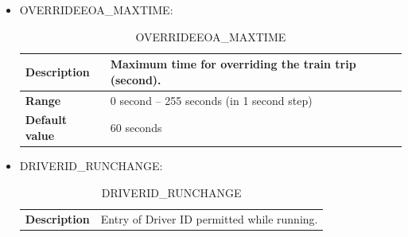 \documentclass{template/openetcs}
\begin{document}
\begin{itemize}
\begin{longtable}{|l|l|}
				\hline
				
			\end{longtable}
			
			
		\item OVERRIDEEOA\_MAXTIME:
		
			\begin{longtable}{|l|l|}
				\caption{OVERRIDEEOA\_MAXTIME}\\ 																									
				\hline
				
					\begin{minipage}[t]{0.22\linewidth} \textbf{Description}	\end{minipage} 
				&	\begin{minipage}[t]{0.78\linewidth} Maximum time for overriding the train trip (second). \end{minipage} \\
				
				\hline
																																				
					\begin{minipage}[t]{0.22\linewidth} \textbf{Range}	\end{minipage} 
				&	\begin{minipage}[t]{0.78\linewidth} 0 second – 255 seconds (in 1 second step) \end{minipage} \\
								
				\hline
										
					\begin{minipage}[t]{0.22\linewidth} \textbf{Default value}	\end{minipage} 
				&	\begin{minipage}[t]{0.78\linewidth} 60 seconds \end{minipage} \\
				
				\hline
				
			\end{longtable}
					
		\item DRIVERID\_RUNCHANGE:
		
			\begin{longtable}{|l|l|}
				\caption{DRIVERID\_RUNCHANGE}\\ 																				
				\hline
				
					\begin{minipage}[t]{0.22\linewidth} \textbf{Description}	\end{minipage} 
				&	\begin{minipage}[t]{0.78\linewidth} Entry of Driver ID permitted while running. \end{minipage} \\
				

\end{longtable}
\end{itemize}
\end{document}
